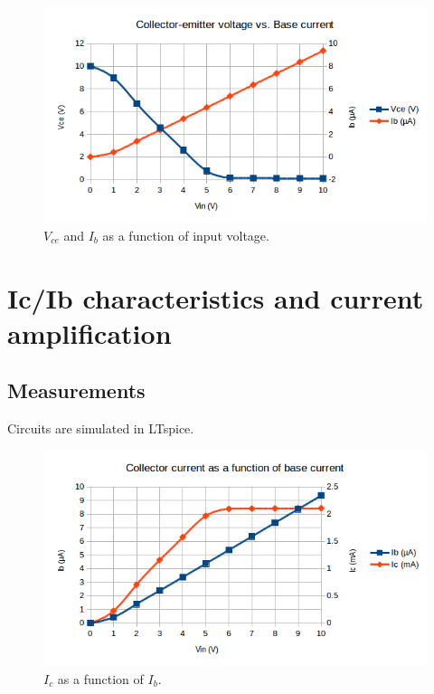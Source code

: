 \documentclass[11pt,a4paper]{article}
\begin{document}
\begin{figure}[htbp]
    \centering
    \includegraphics[width=\textwidth]{img/uce-ib_plot}
    \caption{$V_{ce}$ and $I_{b}$ as a function of input voltage.}
    \label{fig:uce-ib_plot}
\end{figure}

\section{Ic/Ib characteristics and current
amplification}\label{icib-characteristics-and-current-amplification}

\subsection{Measurements}\label{measurements-1}

Circuits are simulated in LTspice.

\begin{figure}[htbp]
    \centering
    \includegraphics[width=\textwidth]{img/ic-ib_plot.png}
    \caption{$I_{c}$ as a function of $I_{b}$.}
    \label{fig:ic-ib_plot}
\end{figure}
\end{document}
